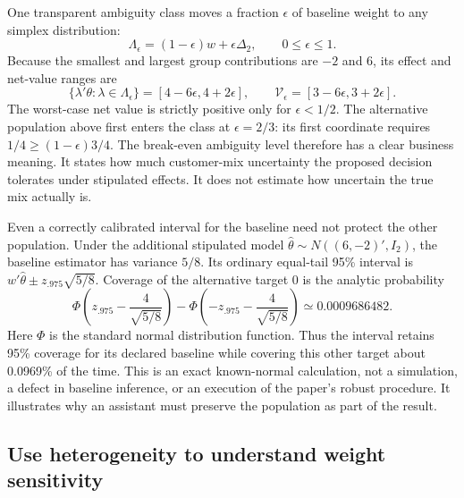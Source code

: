 One transparent ambiguity class moves a fraction $\epsilon$ of baseline
weight to any simplex distribution:
\begin{equation}
 \Lambda_\epsilon=(1-\epsilon)w+\epsilon\Delta_2,
 \qquad 0\leq\epsilon\leq1.
 \label{exec22:targets-class}
\end{equation}
Because the smallest and largest group contributions are $-2$ and $6$, its
effect and net-value ranges are
\begin{equation}
 \{\lambda'\theta:\lambda\in\Lambda_\epsilon\}
   =[4-6\epsilon,4+2\epsilon],\qquad
 \mathcal V_\epsilon=[3-6\epsilon,3+2\epsilon].
 \label{exec22:targets-value}
\end{equation}
The worst-case net value is strictly positive only for $\epsilon<1/2$.
The alternative population above first enters the class at $\epsilon=2/3$:
its first coordinate requires
$1/4\geq(1-\epsilon)3/4$. The break-even ambiguity level therefore has a clear
business meaning. It states how much customer-mix uncertainty the proposed
decision tolerates under stipulated effects. It does not estimate how uncertain
the true mix actually is.

Even a correctly calibrated interval for the baseline need not protect the
other population. Under the additional stipulated model
$\widehat\theta\sim N((6,-2)',I_2)$, the baseline estimator has variance $5/8$.
Its ordinary equal-tail 95\% interval is
$w'\widehat\theta\pm z_{.975}\sqrt{5/8}$. Coverage of the alternative target
$0$ is the analytic probability
\begin{equation}
 \Phi\!\left(z_{.975}-\frac{4}{\sqrt{5/8}}\right)
 -\Phi\!\left(-z_{.975}-\frac{4}{\sqrt{5/8}}\right)
 \simeq0.0009686482.
 \label{exec22:targets-wrong}
\end{equation}
Here $\Phi$ is the standard normal distribution function. Thus the interval
retains 95\% coverage for its declared baseline while covering this other
target about 0.0969\% of the time. This is an exact known-normal calculation,
not a simulation, a defect in baseline inference, or an execution of the
paper's robust procedure. It illustrates why an assistant must preserve the
population as part of the result.

\subsection{Use heterogeneity to understand weight sensitivity}

